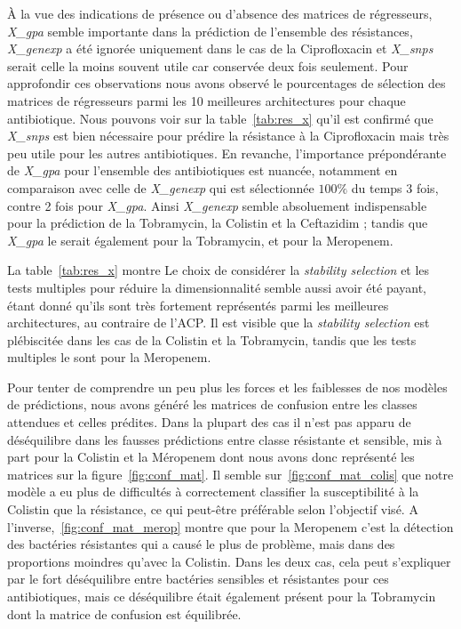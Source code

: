 \documentclass[11pt]{article}
\begin{document}
  À la vue des indications de présence ou d'absence des matrices de régresseurs, \textit{X\_gpa} semble importante dans la prédiction de l'ensemble des résistances, \textit{X\_genexp} a été ignorée uniquement dans le cas de la Ciprofloxacin et \textit{X\_snps} serait celle la moins souvent utile car conservée deux fois seulement.
  Pour approfondir ces observations nous avons observé le pourcentages de sélection des matrices de régresseurs parmi les 10 meilleures architectures pour chaque antibiotique.
  Nous pouvons voir sur la table~\ref{tab:res_x} qu'il est confirmé que \textit{X\_snps} est bien nécessaire pour prédire la résistance à la Ciprofloxacin mais très peu utile pour les autres antibiotiques.
  En revanche, l'importance prépondérante de \textit{X\_gpa} pour l'ensemble des antibiotiques est nuancée, notamment en comparaison avec celle de \textit{X\_genexp} qui est sélectionnée $100\%$ du temps 3 fois, contre 2 fois pour \textit{X\_gpa}.
  Ainsi \textit{X\_genexp} semble absoluement indispensable pour la prédiction de la Tobramycin, la Colistin et la Ceftazidim ;
  tandis que \textit{X\_gpa} le serait également pour la Tobramycin, et pour la Meropenem.

  

  La table~\ref{tab:res_x} montre Le choix de considérer la \textit{stability selection} et les tests multiples pour réduire la dimensionnalité semble aussi avoir été payant, étant donné qu'ils sont très fortement représentés parmi les meilleures architectures, au contraire de l'ACP.
  Il est visible que la \textit{stability selection} est plébiscitée dans les cas de la Colistin et la Tobramycin, tandis que les tests multiples le sont pour la Meropenem.

  Pour tenter de comprendre un peu plus les forces et les faiblesses de nos modèles de prédictions, nous avons généré les matrices de confusion entre les classes attendues et celles prédites.
  Dans la plupart des cas il n'est pas apparu de déséquilibre dans les fausses prédictions entre classe résistante et sensible, mis à part pour la Colistin et la Méropenem dont nous avons donc représenté les matrices sur la figure~\ref{fig:conf_mat}.
  Il semble sur~\ref{fig:conf_mat_colis} que notre modèle a eu plus de difficultés à correctement classifier la susceptibilité à la Colistin que la résistance, ce qui peut-être préférable selon l'objectif visé.
  A l'inverse,~\ref{fig:conf_mat_merop} montre que pour la Meropenem c'est la détection des bactéries résistantes qui a causé le plus de problème, mais dans des proportions moindres qu'avec la Colistin.
  Dans les deux cas, cela peut s'expliquer par le fort déséquilibre entre bactéries sensibles et résistantes pour ces antibiotiques, mais ce déséquilibre était également présent pour la Tobramycin dont la matrice de confusion est équilibrée.
\end{document}
